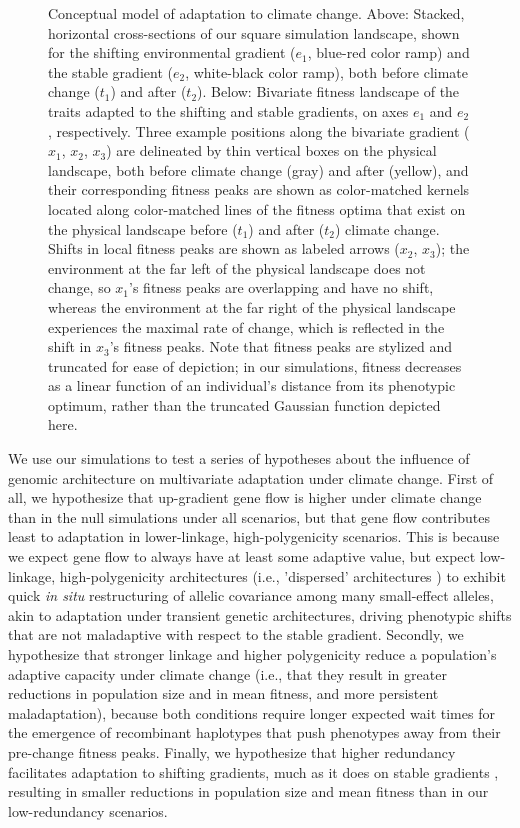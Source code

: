 \documentclass[9pt,twocolumn,twoside,lineno]{pnas-new}
\begin{document}
\begin{figure}
    \caption{Conceptual model of adaptation to climate change. Above: Stacked, horizontal cross-sections of our square simulation landscape, shown for the shifting environmental gradient ($e_{1}$, blue-red color ramp) and the stable gradient ($e_{2}$, white-black color ramp), both before climate change ($t_{1}$) and after ($t_{2}$). Below: Bivariate fitness landscape of the traits adapted to the shifting and stable gradients, on axes $e_{1}$ and $e_{2}$, respectively. Three example positions along the bivariate gradient ($x_{1}$, $x_{2}$, $x_{3}$) are delineated by thin vertical boxes on the physical landscape, both before climate change (gray) and after (yellow), and their corresponding fitness peaks are shown as color-matched kernels located along color-matched lines of the fitness optima that exist on the physical landscape before ($t_{1}$) and after ($t_{2}$) climate change. Shifts in local fitness peaks are shown as labeled arrows ($x_{2}$, $x_{3}$); the environment at the far left of the physical landscape does not change, so $x_{1}$'s fitness peaks are overlapping and have no shift, whereas the environment at the far right of the physical landscape experiences the maximal rate of change, which is reflected in the shift in $x_{3}$'s fitness peaks. Note that fitness peaks are stylized and truncated for ease of depiction; in our simulations, fitness decreases as a linear function of an individual's distance from its phenotypic optimum, rather than the truncated Gaussian function depicted here.}
\label{fig:fig_1}
\end{figure}


We use our simulations to test a series of hypotheses about the influence of genomic architecture 
on multivariate adaptation under climate change. First of all, we hypothesize that up-gradient 
gene flow is higher under climate change than in the null simulations under all 
scenarios, but that gene flow contributes least to adaptation in lower-linkage, 
high-polygenicity scenarios. This is because we expect gene flow to always have
at least some adaptive value, but expect low-linkage, high-polygenicity architectures 
(i.e., 'dispersed' architectures \cite{yeaman_review}) to exhibit quick \textit{in situ}
restructuring of allelic covariance among many small-effect alleles, akin to adaptation 
under transient genetic architectures, driving phenotypic shifts that are not maladaptive 
with respect to the stable gradient. Secondly, we hypothesize that stronger linkage 
and higher polygenicity reduce a population's adaptive capacity under climate change
(i.e., that they result in greater reductions in population size and in mean fitness,
and more persistent maladaptation), because both conditions require longer expected
wait times for the emergence of recombinant haplotypes that push phenotypes
away from their pre-change fitness peaks. Finally, we hypothesize that higher redundancy
facilitates adaptation to shifting gradients, much as it does on stable gradients 
\cite{barghi_redundancy,manceau,yeaman_amnat}, resulting in smaller reductions 
in population size and mean fitness than in our low-redundancy scenarios.
\end{document}

